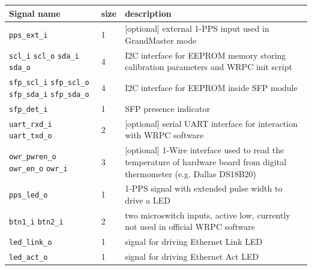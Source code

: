 \begin{center}
  \begin{tabular}{|p{3cm}|l|p{11cm}|}
    \hline
    {\bf Signal name} & {\bf size} & {\bf description} \\
    \hline \hline
    \texttt{pps\_ext\_i} & 1 & [optional] external 1-PPS input used in
    GrandMaster mode\\
    \hline
    \texttt{scl\_i} \linebreak \texttt{scl\_o} \linebreak \texttt{sda\_i} \linebreak
    \texttt{sda\_o} & 4 & I2C interface for EEPROM memory storing calibration
    parameters and WRPC init script\\
    \hline
    \texttt{sfp\_scl\_i} \linebreak \texttt{sfp\_scl\_o} \linebreak
    \texttt{sfp\_sda\_i} \linebreak \texttt{sfp\_sda\_o} & 4 & I2C interface for
    EEPROM inside SFP module\\
    \hline
    \texttt{sfp\_det\_i} & 1 & SFP presence indicator\\
    \hline
    \texttt{uart\_rxd\_i} \linebreak \texttt{uart\_txd\_o} & 2 & [optional] serial
    UART interface for interaction with WRPC software\\
    \hline
    \texttt{owr\_pwren\_o} \linebreak \texttt{owr\_en\_o} \linebreak \texttt{owr\_i} &
    3 & [optional] 1-Wire interface used to read the temperature of hardware board from
    digital thermometer (e.g. Dallas DS18B20)\\
    \hline
    \texttt{pps\_led\_o} & 1 & 1-PPS signal with extended pulse width to drive a
    LED\\
    \hline
    \texttt{btn1\_i} \linebreak \texttt{btn2\_i} & 2 & two microswitch inputs,
    active low, currently not used in official WRPC software\\
    \hline
    \texttt{led\_link\_o} & 1 & signal for driving Ethernet Link LED\\
    \hline
    \texttt{led\_act\_o} & 1 & signal for driving Ethernet Act LED\\
    \hline
  \end{tabular}
\end{center}
